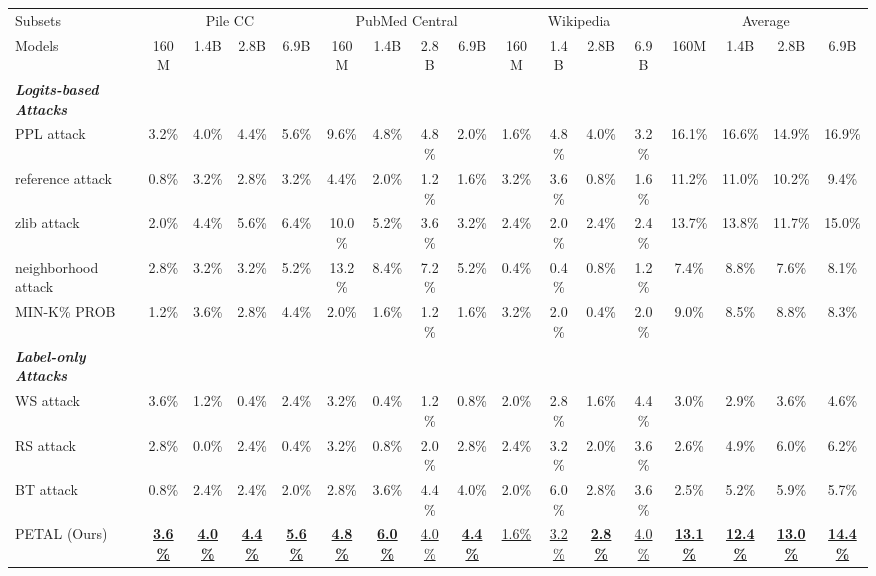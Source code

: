 \begin{table*}[!t]
{\begin{tabular}{l|cccccccccccccccc}
\vspace{-.9em}\\
\toprule
Subsets & \multicolumn{4}{c}{Pile CC}&  \multicolumn{4}{c}{PubMed Central}& \multicolumn{4}{c}{Wikipedia}& \multicolumn{4}{c}{Average}\\
\cmidrule(l{5pt}r{5pt}){2-5}\cmidrule(l{5pt}r{5pt}){6-9}\cmidrule(l{5pt}r{5pt}){10-13}\cmidrule(l{5pt}r{5pt}){14-17}
Models & 160M& 1.4B& 2.8B& 6.9B& 160M& 1.4B& 2.8B& 6.9B& 160M& 1.4B& 2.8B& 6.9B& 160M& 1.4B& 2.8B& 6.9B\\
\midrule
\textbf{\textit{Logits-based Attacks}}&&&&&&&&&&&&\\
PPL attack&3.2\%&4.0\%&4.4\%&5.6\%&9.6\%&4.8\%&4.8\%&2.0\%&1.6\%&4.8\%&4.0\%&3.2\%&16.1\%&16.6\%&14.9\%&16.9\%\\
reference attack&0.8\%&3.2\%&2.8\%&3.2\%&4.4\%&2.0\%&1.2\%&1.6\%&3.2\%&3.6\%&0.8\%&1.6\%&11.2\%&11.0\%&10.2\%&9.4\%\\
zlib attack&2.0\%&4.4\%&5.6\%&6.4\%&10.0\%&5.2\%&3.6\%&3.2\%&2.4\%&2.0\%&2.4\%&2.4\%&13.7\%&13.8\%&11.7\%&15.0\%\\
neighborhood attack&2.8\%&3.2\%&3.2\%&5.2\%&13.2\%&8.4\%&7.2\%&5.2\%&0.4\%&0.4\%&0.8\%&1.2\%&7.4\%&8.8\%&7.6\%&8.1\%\\
MIN-K\% PROB&1.2\%&3.6\%&2.8\%&4.4\%&2.0\%&1.6\%&1.2\%&1.6\%&3.2\%&2.0\%&0.4\%&2.0\%&9.0\%&8.5\%&8.8\%&8.3\%\\
\textbf{\textit{Label-only Attacks}}&&&&&&&&&&&&\\
WS attack&3.6\%&1.2\%&0.4\%&2.4\%&3.2\%&0.4\%&1.2\%&0.8\%&2.0\%&2.8\%&1.6\%&4.4\%&3.0\%&2.9\%&3.6\%&4.6\%\\
RS attack&2.8\%&0.0\%&2.4\%&0.4\%&3.2\%&0.8\%&2.0\%&2.8\%&2.4\%&3.2\%&2.0\%&3.6\%&2.6\%&4.9\%&6.0\%&6.2\%\\
BT attack&0.8\%&2.4\%&2.4\%&2.0\%&2.8\%&3.6\%&4.4\%&4.0\%&2.0\%&6.0\%&2.8\%&3.6\%&2.5\%&5.2\%&5.9\%&5.7\%\\
PETAL (Ours)&\ul{\textbf{3.6\%}}&\ul{\textbf{4.0\%}}&\ul{\textbf{4.4\%}}&\ul{\textbf{5.6\%}}&\ul{\textbf{4.8\%}}&\ul{\textbf{6.0\%}}&\ul{4.0\%}&\ul{\textbf{4.4\%}}&\ul{1.6\%}&\ul{3.2\%}&\ul{\textbf{2.8\%}}&\ul{4.0\%}&\ul{\textbf{13.1\%}}&\ul{\textbf{12.4\%}}&\ul{\textbf{13.0\%}}&\ul{\textbf{14.4\%}}\\
\bottomrule
\end{tabular}
}
\label{table:main results TPR on MIMIR}
\end{table*}